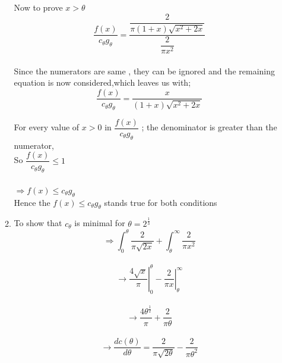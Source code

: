 \documentclass[letterpaper]{article}
\begin{document}
\begin{enumerate}
\begin{enumerate}
Now to prove $ x > \theta $ \\
\begin{equation*}
\dfrac{f(x)}{c_{\theta}g_{\theta}} =\dfrac{\dfrac{2}{\pi(1+x) \sqrt{x^2+2x}}}{\dfrac{2}{\pi x^2}}
\end{equation*}\\

Since the numerators are same , they can be ignored and the remaining equation is now considered,which leaves us with;\\

\begin{equation*}
\dfrac{f(x)}{c_{\theta}g_{\theta}} = \dfrac {x}{(1+x)\sqrt{x^2+2x}}
\end{equation*}

 For every value of $x > 0$ in $ \dfrac{f(x)}{c_{\theta}g_{\theta}}$ ; the denominator is greater than the numerator,\\

So $\dfrac{f(x)}{c_{\theta} g_{\theta}} \leq 1 $\\\\

$\Rightarrow f(x) \leq c_{\theta} g_{\theta}$\\

Hence the $  f(x) \leq c_{\theta} g_{\theta} $ stands true for both conditions \\



\item To show that $c_{\theta}$ is minimal for $\theta=2^{\frac{1}{3}}$\\

\begin{equation*}
\Rightarrow \int_{0}^{\theta}\dfrac{2}{\pi \sqrt{2x}}+\int_{\theta}^{\infty}\dfrac{2}{\pi x^2}
\end{equation*}\\

\begin{equation*}
\rightarrow\left.\frac{4\sqrt{x}}{\pi}\right|_0^\theta -\left.\frac{2}{\pi x}\right|_\theta^\infty
\end{equation*}\\

\begin{equation*}
\rightarrow\dfrac{4 \theta^{\frac{1}{2}}}{\pi}+\dfrac{2}{\pi \theta}
\end{equation*}\\

\begin{equation*}
\rightarrow\dfrac{dc(\theta)}{d \theta} = \dfrac{2}{\pi \sqrt{2 \theta}}-\dfrac{2}{\pi \theta^2}
\end{equation*}\\


\end{enumerate}
\end{enumerate}
\end{document}

